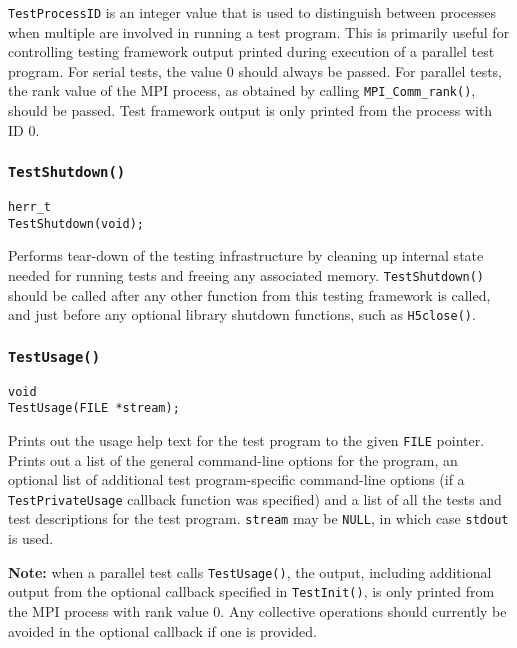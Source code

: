 \documentclass[../HDF5_RFC.tex]{subfiles}
\begin{document}
\texttt{TestProcessID} is an integer value that is used to distinguish between processes when multiple
are involved in running a test program. This is primarily useful for controlling testing framework output
printed during execution of a parallel test program. For serial tests, the value 0 should always be passed.
For parallel tests, the rank value of the MPI process, as obtained by calling \texttt{MPI\_Comm\_rank()}, should be passed. Test framework output is only printed from the process with ID 0.

\subsubsection{\texttt{TestShutdown()}}

\begin{verbatim}
herr_t
TestShutdown(void);
\end{verbatim}

Performs tear-down of the testing infrastructure by cleaning up internal state needed for running
tests and freeing any associated memory. \texttt{TestShutdown()} should be called after any other function
from this testing framework is called, and just before any optional library shutdown functions, such as
\texttt{H5close()}.

\subsubsection{\texttt{TestUsage()}}

\begin{verbatim}
void
TestUsage(FILE *stream);
\end{verbatim}

Prints out the usage help text for the test program to the given \texttt{FILE} pointer. Prints out a
list of the general command-line options for the program, an optional list of additional test
program-specific command-line options (if a \texttt{TestPrivateUsage} callback function was specified)
and a list of all the tests and test descriptions for the test program. \texttt{stream} may be \texttt{NULL},
in which case \texttt{stdout} is used.

\textbf{Note:} when a parallel test calls \texttt{TestUsage()}, the output, including additional output
from the optional callback specified in \texttt{TestInit()}, is only printed from the MPI process with rank
value 0. Any collective operations should currently be avoided in the optional callback if one is provided.
\end{document}
